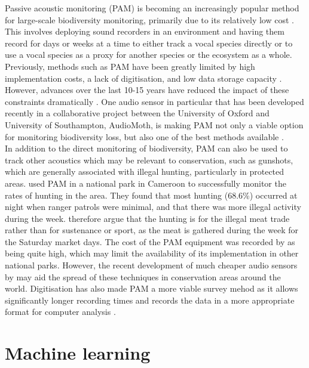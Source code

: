 Passive acoustic monitoring (PAM) is becoming an increasingly popular method for large-scale biodiversity monitoring, primarily due to its relatively low cost \citep{Browning2017, Gibb2019}. This involves deploying sound recorders in an environment and having them record for days or weeks at a time to either track a vocal species directly or to use a vocal species as a proxy for another species or the ecosystem as a whole. Previously, methods such as PAM have been greatly limited by high implementation costs, a lack of digitisation, and low data storage capacity \citep{Merchant2015}. However, advances over the last 10-15 years have reduced the impact of these constraints dramatically \citep{Hill2018, Gibb2019}. One audio sensor in particular that has been developed recently in a collaborative project between the University of Oxford and University of Southampton, AudioMoth, is making PAM not only a viable option for monitoring biodiversity loss, but also one of the best methods available \citep{Hill2018}. \\

\noindent In addition to the direct monitoring of biodiversity, PAM can also be used to track other acoustics which may be relevant to conservation, such as gunshots, which are generally associated with illegal hunting, particularly in protected areas. \cite{Astaras2017} used PAM in a national park in Cameroon to successfully monitor the rates of hunting in the area. They found that most hunting (68.6\%) occurred at night when ranger patrols were minimal, and that there was more illegal activity during the week. \cite{Astaras2017} therefore argue that the hunting is for the illegal meat trade rather than for sustenance or sport, as the meat is gathered during the week for the Saturday market days. The cost of the PAM equipment was recorded by \cite{Astaras2017} as being quite high, which may limit the availability of its implementation in other national parks. However, the recent development of much cheaper audio sensors by \cite{Hill2018} may aid the spread of these techniques in conservation areas around the world. Digitisation has also made PAM a more viable survey mehod as it allows significantly longer recording times and records the data in a more appropriate format for computer analysis \citep{Hill2018, Gibb2019}.


\section{Machine learning}

